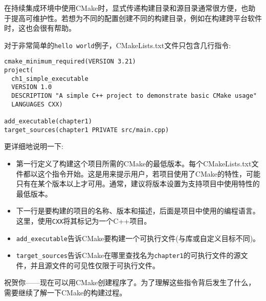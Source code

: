 在持续集成环境中使用CMake时，显式传递构建目录和源目录通常很方便，也助于提高可维护性。若想为不同的配置创建不同的构建目录，例如在构建跨平台软件时，这也会很有帮助。


对于非常简单的\texttt{hello world}例子，CMakeLists.txt文件只包含几行指令:

\begin{lstlisting}[style=styleCMake]
cmake_minimum_required(VERSION 3.21)
project(
  ch1_simple_executable
  VERSION 1.0
  DESCRIPTION "A simple C++ project to demonstrate basic CMake usage"
  LANGUAGES CXX)

add_executable(chapter1)
target_sources(chapter1 PRIVATE src/main.cpp)
\end{lstlisting}

更详细地说明一下:

\begin{itemize}
\item 
第一行定义了构建这个项目所需的CMake的最低版本。每个CMakeLists.txt文件都以这个指令开始。这是用来提示用户，若项目使用了CMake的特性，可能只有在某个版本以上才可用。通常，建议将版本设置为支持项目中使用特性的最低版本。

\item 
下一行是要构建的项目的名称、版本和描述，后面是项目中使用的编程语言。这里，使用\texttt{CXX}将其标记为一个C++项目。

\item 
\texttt{add\_executable}告诉CMake要构建一个可执行文件(与库或自定义目标不同)。

\item 
\texttt{target\_sources}告诉CMake在哪里查找名为\texttt{chapter1}的可执行文件的源文件，并且源文件的可见性仅限于可执行文件。
\end{itemize}

祝贺你——现在可以用CMake创建程序了。为了理解这些指令背后发生了什么，需要继续了解一下CMake的构建过程。































